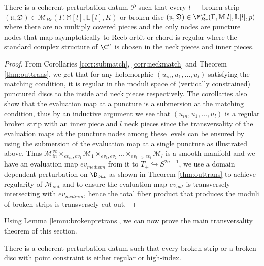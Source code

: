 \begin{lemma}\label{lemm:brokenpretrans}
There is a coherent perturbation datum $\mathcal{P}$ such that every $l-$ broken strip $(\mathfrak{u,D}) \in \mathcal{M}_{Br}(\Gamma,\mathbb{M}[l],\mathbb{L}[l],K) $ or broken disc $(\mathfrak{u,D})\in \M^{vc}_{Br}(\Gamma,\mathbb M [l], \mathbb{L}[l],p)$ where there are no multiply covered pieces and the only nodes are puncture nodes that map asymptotically to Reeb orbit or chord is regular where the standard complex structure of $\C^n$ is chosen in the neck pieces and inner pieces.
\end{lemma}

\begin{proof}
From Corollaries \ref{corr:submatch}, \ref{corr:neckmatch} and Theorem \ref{thm:outtrans}, we get that for any  holomorphic $(u_{in},u_1,\dots,u_{l})$ satisfying the matching condition, it is regular in the moduli space of (vertically constrained) punctured discs to the inside and neck pieces respectively.  The corollaries also show that the evaluation map at a puncture is a submersion at the matching condition, thus by an inductive argument we see that $(u_{in},u_1,\dots, u_l)$  is a regular broken strip with an inner piece and $l$ neck pieces since the transversality of the evaluation maps at the puncture nodes among these levels can be ensured by using the submersion of the evaluation map at a single puncture as illustrated above. Thus $\mathcal{M}^{vc}_{in} \times_{ev_{in},ev_1} \mathcal{M}_1 \times_{ev_1,ev_2} \dots \times_{ev_{l-1},ev_l}\mathcal{M}_l $ is a smooth manifold and we have an evaluation map $ev_{medium}$ from it to $T_\pm \hookrightarrow S^{2n-1}$, we use a domain dependent perturbation on $\D_{out}$ as shown in Theorem \ref{thm:outtrans} to achieve regularity of $\mathcal{M}_{out}$ and to ensure the evaluation map $ev_{out}$ is transversely intersecting with $ev_{medium}$, hence the total fiber product that produces the moduli of broken strips is transversely cut out. 
\end{proof}


\noindent Using Lemma \ref{lemm:brokenpretrans}, we can now prove the main transversality theorem of this section.



\begin{Theorem}\label{thm:ultimatetransversality}
There is a coherent perturbation datum such that every broken strip or a broken disc with point constraint is either regular or high-index.
\end{Theorem}

